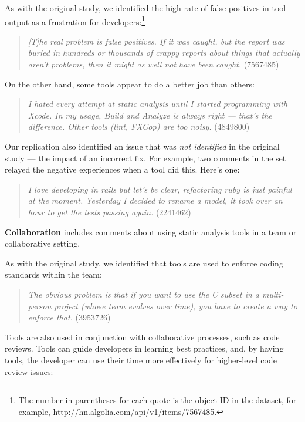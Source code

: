 \documentclass{sig-alternate}
\begin{document}
As with the original study, we identified the high rate of false positives in tool output as a frustration for developers:\footnote{The number in parentheses for each quote is the object ID in the dataset, for example, \url{http://hn.algolia.com/api/v1/items/7567485}.}

\begin{quote}
\textit{[T]he real problem is false positives.  If it was caught, but the report was buried in hundreds or thousands of crappy reports about things that actually aren't problems, then it might as well not have been caught.} (7567485)
\end{quote}

On the other hand, some tools appear to do a better job than others:

\begin{quote}
\textit{I hated every attempt at static analysis until I started programming with Xcode. In my usage, Build and Analyze is always right --- that's the difference. Other tools (lint, FXCop) are too noisy.} (4849800)
\end{quote}

Our replication also identified an issue that was \textit{not identified} in the original study --- the impact of an incorrect fix. For example, two comments in the set relayed the negative experiences when a tool did this. Here's one:

\begin{quote}
\textit{I love developing in rails but let's be clear, refactoring ruby is just painful at the moment. Yesterday I decided to rename a model, it took over an hour to get the tests passing again.} (2241462)
\end{quote}

\textbf{Collaboration} includes comments about using static analysis tools in a team or collaborative setting.

As with the original study, we identified that tools are used to enforce coding standards within the team:

\begin{quote}
\textit{The obvious problem is that if you want to use the C subset in a multi-person project (whose team evolves over time), you have to create a way to enforce that.} (3953726)
\end{quote}

Tools are also used in conjunction with collaborative processes, such as code reviews. Tools can guide developers in learning best practices, and, by having tools, the developer can use their time more effectively for higher-level code review issues:
\end{document}
